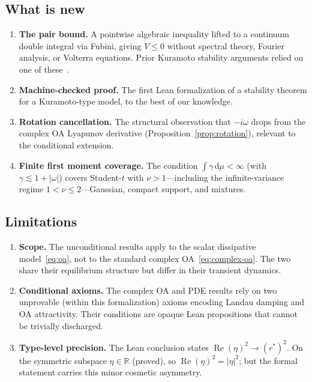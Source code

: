 \documentclass[11pt,a4paper]{article}
\theoremstyle{definition}
\DeclareMathOperator{\re}{Re}
\newcommand{\R}{\mathbb{R}}
\begin{document}
\subsection{What is new}

\begin{enumerate}
\item \textbf{The pair bound.} A pointwise algebraic inequality lifted to a continuum double integral via Fubini, giving $\dot V\leq 0$ without spectral theory, Fourier analysis, or Volterra equations. Prior Kuramoto stability arguments relied on one of these~\cite{dietert2016,dietert-fernandez2018,chiba2015}.

\item \textbf{Machine-checked proof.} The first Lean formalization of a stability theorem for a Kuramoto-type model, to the best of our knowledge.

\item \textbf{Rotation cancellation.} The structural observation that $-i\omega$ drops from the complex OA Lyapunov derivative (Proposition~\ref{prop:rotation}), relevant to the conditional extension.

\item \textbf{Finite first moment coverage.} The condition $\int\gamma\,\mathrm{d}\mu<\infty$ (with $\gamma\lesssim 1+|\omega|$) covers Student-$t$ with $\nu>1$---including the infinite-variance regime $1<\nu\leq 2$---Gaussian, compact support, and mixtures.
\end{enumerate}

\subsection{Limitations}

\begin{enumerate}
\item \textbf{Scope.} The unconditional results apply to the scalar dissipative model~\eqref{eq:oa}, not to the standard complex OA~\eqref{eq:complex-oa}. The two share their equilibrium structure but differ in their transient dynamics.

\item \textbf{Conditional axioms.} The complex OA and PDE results rely on two unprovable (within this formalization) axioms encoding Landau damping and OA attractivity. Their conditions are opaque Lean propositions that cannot be trivially discharged.

\item \textbf{Type-level precision.} The Lean conclusion states $\re(\eta)^2\to(r^*)^2$. On the symmetric subspace $\eta\in\R$ (proved), so $\re(\eta)^2=|\eta|^2$; but the formal statement carries this minor cosmetic asymmetry.
\end{enumerate}
\end{document}
